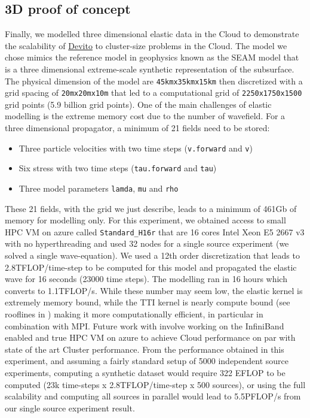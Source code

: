 \documentclass[conference]{IEEEtran}
\begin{document}
\subsection{3D proof of concept}\label{d-proof-of-concept}

Finally, we modelled three dimensional elastic data in the Cloud to
demonstrate the scalability of
\href{https://github.com/devitocodes/devito}{Devito} to cluster-size
problems in the Cloud. The model we chose mimics the reference model in
geophysics known as the SEAM model \cite{fehler2011seam} that is a
three dimensional extreme-scale synthetic representation of the
subsurface. The physical dimension of the model are
\texttt{45kmx35kmx15km} then discretized with a grid spacing of
\texttt{20mx20mx10m} that led to a computational grid of
\texttt{2250x1750x1500} grid points (5.9 billion grid points). One of
the main challenges of elastic modelling is the extreme memory cost due
to the number of wavefield. For a three dimensional propagator, a
minimum of 21 fields need to be stored:

\begin{itemize}
\itemsep1pt\parskip0pt
\item
  Three particle velocities with two time steps (\texttt{v.forward} and
  \texttt{v})
\item
  Six stress with two time steps (\texttt{tau.forward} and \texttt{tau})
\item
  Three model parameters \texttt{lamda}, \texttt{mu} and \texttt{rho}
\end{itemize}

These 21 fields, with the grid we just describe, leads to a minimum of
461Gb of memory for modelling only. For this experiment, we obtained
access to small HPC VM on azure called \texttt{Standard\_H16r} that are
16 cores Intel Xeon E5 2667 v3 with no hyperthreading and used 32 nodes
for a single source experiment (we solved a single wave-equation). We
used a 12th order discretization that leads to 2.8TFLOP/time-step to be
computed for this model and propagated the elastic wave for 16 seconds
(23000 time steps). The modelling ran in 16 hours which converts to
1.1TFLOP/s. While these number may seem low, the elastic kernel is
extremely memory bound, while the TTI kernel is nearly compute bound
(see rooflines in \cite{louboutin2016ppf, devito-api, devito-compiler})
making it more computationally efficient, in particular in combination
with MPI. Future work with involve working on the InfiniBand enabled and
true HPC VM on azure to achieve Cloud performance on par with state of
the art Cluster performance. From the performance obtained in this
experiment, and assuming a fairly standard setup of 5000 independent
source experiments, computing a synthetic dataset would require 322
EFLOP to be computed (23k time-steps x 2.8TFLOP/time-step x 500
sources), or using the full scalability and computing all sources in
parallel would lead to 5.5PFLOP/s from our single source experiment
result.
\end{document}
